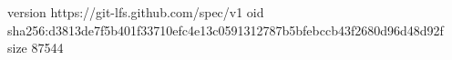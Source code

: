 version https://git-lfs.github.com/spec/v1
oid sha256:d3813de7f5b401f33710efc4e13c0591312787b5bfebccb43f2680d96d48d92f
size 87544
